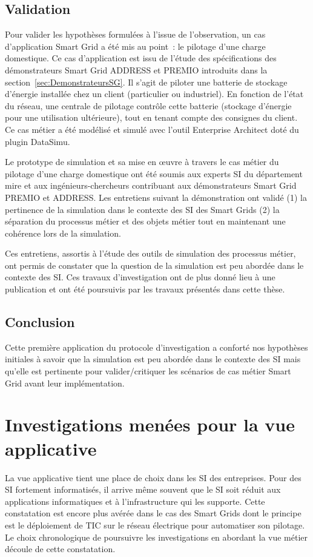 \subsection{Validation}
Pour valider les hypothèses formulées à l'issue de l'observation, un cas 
d'application Smart Grid a été mis au point~: le pilotage d'une charge 
domestique. Ce cas d'application est issu de l'étude des spécifications des 
démonstrateurs Smart Grid ADDRESS et PREMIO introduits dans la 
section~\ref{sec:DemonstrateursSG}. Il s'agit de piloter une batterie de 
stockage d'énergie installée chez un client (particulier ou industriel). En 
fonction de l'état du réseau, une centrale de pilotage contrôle cette batterie 
(stockage d'énergie pour une utilisation ultérieure), tout en tenant compte des 
consignes du client. Ce cas métier a été modélisé et simulé avec l'outil 
Enterprise Architect doté du plugin DataSimu.
			
Le prototype de simulation et sa mise en œuvre à travers le cas métier du 
pilotage d'une charge domestique ont été soumis aux experts SI du département 
\gls{mire} et aux ingénieurs-chercheurs contribuant aux démonstrateurs Smart 
Grid PREMIO et ADDRESS. Les entretiens suivant la démonstration ont validé (1) 
la pertinence de la simulation dans le contexte des SI des Smart Grids (2) la 
séparation du processus métier et des objets métier tout en maintenant une 
cohérence lors de la simulation.
			
Ces entretiens, assortis à l'étude des outils de simulation des processus 
métier, ont permis de constater que la question de la simulation est peu abordée 
dans le contexte des SI. Ces travaux d'investigation ont de plus donné lieu à 
une publication \cite{seghiri2012animation} et ont été poursuivis par les 
travaux présentés dans cette thèse.
 
\subsection{Conclusion}
Cette première application du protocole d'investigation a conforté nos hypothèses initiales à savoir que la simulation est peu abordée dans le contexte des SI mais qu'elle est pertinente pour valider/critiquer les scénarios de cas métier Smart Grid avant leur implémentation.

\section{Investigations menées pour la vue applicative} 
\label{sec:investig_appli}
La vue applicative tient une place de choix dans les SI des entreprises. Pour des SI fortement informatisés, il arrive même souvent que le SI soit réduit aux applications informatiques et à l'infrastructure qui les supporte. Cette constatation est encore plus avérée dans le cas des Smart Grids dont le principe est le déploiement de TIC sur le réseau électrique pour automatiser son pilotage. Le choix chronologique de poursuivre les investigations en abordant la vue métier découle de cette constatation.		
			
